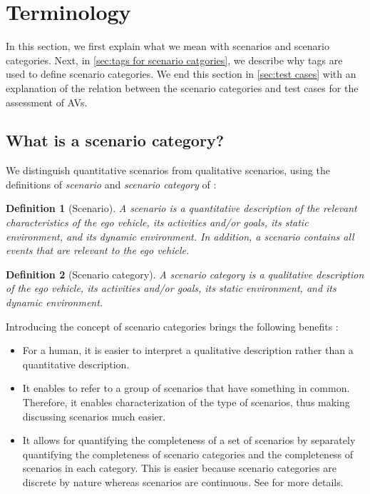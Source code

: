 \documentclass[twoside,twocolumn,9pt]{extarticle}
\theoremstyle{plain}
\newtheorem{definition}{Definition}
\begin{document}
\section{Terminology}
\label{sec:scenario category}

In this section, we first explain what we mean with scenarios and scenario categories. Next, in \cref{sec:tags for scenario catgories}, we describe why tags are used to define scenario categories. We end this section in \cref{sec:test cases} with an explanation of the relation between the scenario categories and test cases for the assessment of AVs.



\subsection{What is a scenario category?}
\label{sec:definition scenario category}

We distinguish quantitative scenarios from qualitative scenarios, using the definitions of \emph{scenario} and \emph{scenario category} of \autocite{degelder2020ontology}:

\begin{definition}[Scenario]
	\label{def:scenario}
	A scenario is a quantitative description of the relevant characteristics of the ego vehicle, its activities and/or goals, its static environment, and its dynamic environment. In addition, a scenario contains all events that are relevant to the ego vehicle.
\end{definition}

\begin{definition}[Scenario category]
	\label{def:scenario category}
	A scenario category is a qualitative description of the ego vehicle, its activities and/or goals, its static environment, and its dynamic environment.
\end{definition}

Introducing the concept of scenario categories brings the following benefits \autocite{degelder2020ontology}:
\begin{itemize}
	\item For a human, it is easier to interpret a qualitative description rather than a quantitative description.
	\item It enables to refer to a group of scenarios that have something in common. Therefore, it enables characterization of the type of scenarios, thus making discussing scenarios much easier.
	\item It allows for quantifying the completeness of a set of scenarios by separately quantifying the completeness of scenario categories and the completeness of scenarios in each category.
	This is easier because scenario categories are discrete by nature whereas scenarios are continuous. See \autocite{degelder2019completeness} for more details.
\end{itemize}
\end{document}
